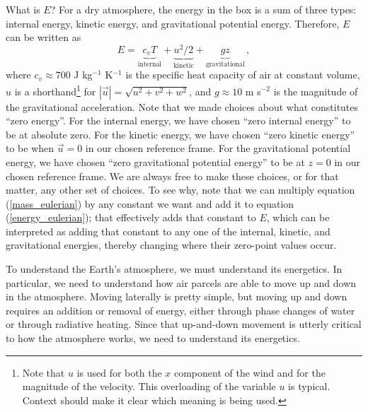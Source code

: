 \documentclass[12pt]{article}
\begin{document}
What is $E$?  For a dry atmosphere, the energy in the box is a sum of three types: internal energy, kinetic energy, and gravitational potential energy.  Therefore, $E$ can be written as
\begin{equation}
E = \underbrace{c_v T}_{\text{internal}} + \underbrace{u^2/2}_{\text{kinetic}} + \underbrace{gz}_{\text{gravitational}} \, , \label{Edef}
\end{equation}
where $c_v \approx 700$ J kg$^{-1}$ K$^{-1}$ is the specific heat capacity of air at constant volume, $u$ is a shorthand\footnote{Note that $u$ is used for both the $x$ component of the wind and for the magnitude of the velocity.  This overloading of the variable $u$ is typical.  Context should make it clear which meaning is being used.} for $|\vec{u}| = \sqrt{u^2 + v^2 + w^2}$, and $g \approx 10$ m s$^{-2}$ is the magnitude of the gravitational acceleration.  Note that we made choices about what constitutes ``zero energy''.  For the internal energy, we have chosen ``zero internal energy'' to be at absolute zero.  For the kinetic energy, we have chosen ``zero kinetic energy'' to be when $\vec{u} = 0$ in our chosen reference frame.  For the gravitational potential energy, we have chosen ``zero gravitational potential energy'' to be at $z=0$ in our chosen reference frame.  We are always free to make these choices, or for that matter, any other set of choices.  To see why, note that we can multiply equation (\ref{mass_eulerian}) by any constant we want and add it to equation (\ref{energy_eulerian}); that effectively adds that constant to $E$, which can be interpreted as adding that constant to any one of the internal, kinetic, and gravitational energies, thereby changing where their zero-point values occur.


To understand the Earth's atmosphere, we must understand its energetics.  In particular, we need to understand how air parcels are able to move up and down in the atmosphere.  Moving laterally is pretty simple, but moving up and down requires an addition or removal of energy, either through phase changes of water or through radiative heating.  Since that up-and-down movement is utterly critical to how the atmosphere works, we need to understand its energetics.
\end{document}
